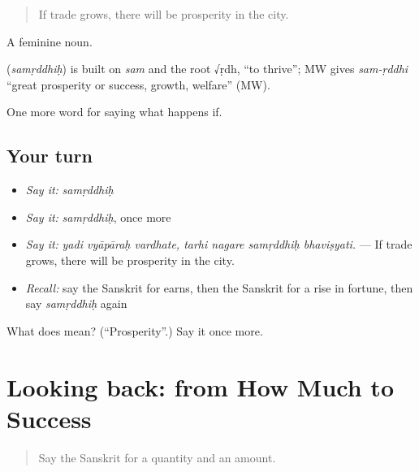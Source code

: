 \begin{quote}
If trade grows, there will be prosperity in the city.
\end{quote}

A feminine noun.

\begin{cousinweb}
\textbf{} (\emph{samṛddhiḥ}) is built on \emph{sam} and the root √ṛdh, \textquotedblleft{}to thrive\textquotedblright{}; MW gives \emph{sam-ṛddhi} \textquotedblleft{}great prosperity or success, growth, welfare\textquotedblright{} (MW).
\end{cousinweb}

\begin{grammarlens}[title={What you've built}]
One more word for saying what happens if.
\end{grammarlens}

\subsection*{Your turn}
\begin{itemize}
\raggedright
  \item \emph{Say it:} \emph{samṛddhiḥ}
  \item \emph{Say it:} \emph{samṛddhiḥ}, once more
  \item \emph{Say it:} \emph{yadi vyāpāraḥ vardhate, tarhi nagare samṛddhiḥ bhaviṣyati.} — If trade grows, there will be prosperity in the city.
  \item \emph{Recall:} say the Sanskrit for earns, then the Sanskrit for a rise in fortune, then say \emph{samṛddhiḥ} again
\end{itemize}

\begin{tcolorbox}[breakable,colback=teal!4,colframe=teal!35!black,title={Before you move on}]
What does  mean? (\textquotedblleft{}Prosperity\textquotedblright{}.) Say it once more.
\end{tcolorbox}
\section[(dialogue)]{Looking back: from How Much to Success}

\label{lesson:SA-R386-review-380-386}



\begin{quote}
Say the Sanskrit for a quantity and an amount.
\end{quote}

